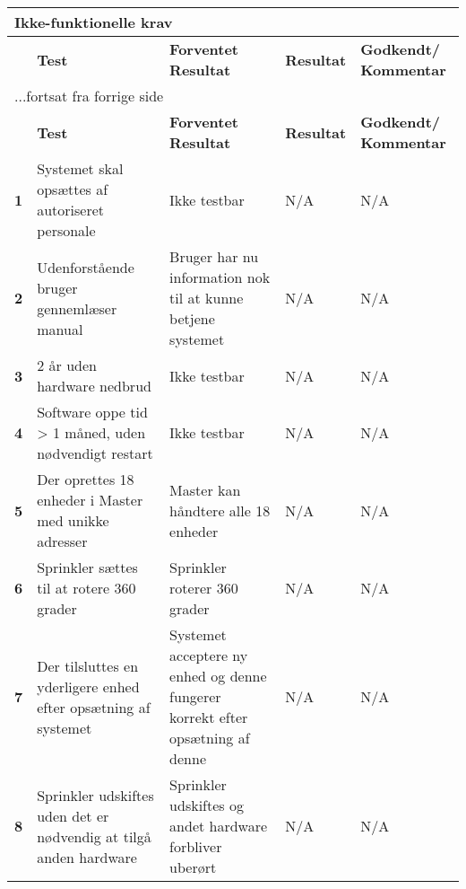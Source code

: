\begin{center}
\begin{longtable}{|p{}|p{}|p{}|p{}|p{}|} %
\hline
\multicolumn{5}{|l|}{\textbf{Ikke-funktionelle krav}} \\ \hline
\multicolumn{1}{|c|}{} &
\textbf{Test} &
\textbf{Forventet \newline Resultat} &
\textbf{Resultat} &
\textbf{Godkendt/ \newline Kommentar} \\ \hline 
\endfirsthead

\multicolumn{5}{l}{...fortsat fra forrige side} \\ \hline 
\multicolumn{1}{|c|}{} &
\textbf{Test} &
\textbf{Forventet \newline Resultat} &
\textbf{Resultat} &
\textbf{Godkendt/ \newline Kommentar} \\ \hline 
\endhead

\textbf{1}	&Systemet skal opsættes af autoriseret personale
			&Ikke testbar
			&N/A
			&N/A \\ \hline 
			
\textbf{2}	&Udenforstående bruger gennemlæser manual
			&Bruger har nu information nok til at kunne betjene systemet
			&N/A
			&N/A \\ \hline 
			
\textbf{3}	&2 år uden hardware nedbrud
			&Ikke testbar
			&N/A
			&N/A \\ \hline 
			
\textbf{4}	&Software oppe tid > 1 måned, uden nødvendigt restart
			&Ikke testbar
			&N/A
			&N/A \\ \hline 
			
\textbf{5}	&Der oprettes 18 enheder i Master med unikke adresser
			&Master kan håndtere alle 18 enheder
			&N/A
			&N/A \\ \hline 
			
\textbf{6}	&Sprinkler sættes til at rotere 360 grader
			&Sprinkler roterer 360 grader
			&N/A
			&N/A \\ \hline 
			
\textbf{7}	&Der tilsluttes en yderligere enhed efter opsætning af systemet
			&Systemet acceptere ny enhed og denne fungerer korrekt efter opsætning af denne
			&N/A
			&N/A \\ \hline 
			
\textbf{8}	&Sprinkler udskiftes uden det er nødvendig at tilgå anden hardware
			&Sprinkler udskiftes og andet hardware forbliver uberørt
			&N/A
			&N/A \\ \hline 
			

\end{longtable}
\end{center}
